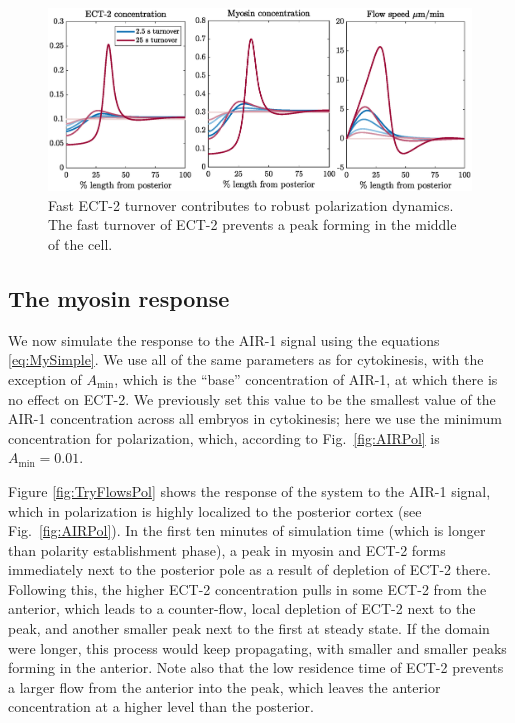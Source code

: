 \documentclass[11pt]{article}
\newcommand{\red}[1]{\color{red}#1\normalcolor}
\begin{document}
\begin{figure}
\centering
\includegraphics[width=\textwidth]{Glotzer/ECT2Residence.eps}
\caption{\label{fig:EctTurn}Fast ECT-2 turnover contributes to robust polarization dynamics. The fast turnover of ECT-2 prevents a peak forming in the middle of the cell.}
\end{figure}


\subsection{The myosin response}

We now simulate the response to the AIR-1 signal using the equations \eqref{eq:MySimple}. We use all of the same parameters as for cytokinesis, with the exception of $A_\text{min}$, which is the ``base'' concentration of AIR-1, at which there is no effect on ECT-2. We previously set this value to be the smallest value of the AIR-1 concentration across all embryos in cytokinesis; here we use the minimum concentration for polarization, which, according to Fig.\ \ref{fig:AIRPol} is $A_\text{min}=0.01$. 


\red{Figure \ref{fig:TryFlowsPol} shows the response of the system to the AIR-1 signal, which in polarization is highly localized to the posterior cortex (see Fig.\ \ref{fig:AIRPol}). In the first ten minutes of simulation time (which is longer than polarity establishment phase), a peak in myosin and ECT-2 forms immediately next to the posterior pole as a result of depletion of ECT-2 there. Following this, the higher ECT-2 concentration pulls in some ECT-2 from the anterior, which leads to a counter-flow, local depletion of ECT-2 next to the peak, and another smaller peak next to the first at steady state. If the domain were longer, this process would keep propagating, with smaller and smaller peaks forming in the anterior. Note also that the low residence time of ECT-2 prevents a larger flow from the anterior into the peak, which leaves the anterior concentration at a higher level than the posterior.}
\end{document}
